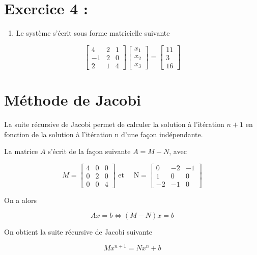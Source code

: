 \documentclass[10pt]{article}
\begin{document}
\section*{Exercice 4 :}
\begin{enumerate}
  \item Le système s'écrit sous forme matricielle suivante
\end{enumerate}

\[
\left[\begin{array}{ccc}
4 & 2 & 1 \\
-1 & 2 & 0 \\
2 & 1 & 4
\end{array}\right]\left[\begin{array}{l}
x_{1} \\
x_{2} \\
x_{3}
\end{array}\right]=\left[\begin{array}{c}
11 \\
3 \\
16
\end{array}\right]
\]

\section*{Méthode de Jacobi}
La suite récursive de Jacobi permet de calculer la solution à l'itération \(n+1\) en fonction de la solution à l'itération n d'une façon indépendante.

La matrice \(A\) s'écrit de la façon suivante \(A=M-N\), avec

\[
M=\left[\begin{array}{lll}
4 & 0 & 0 \\
0 & 2 & 0 \\
0 & 0 & 4
\end{array}\right] \text { et } \quad \mathrm{N}=\left[\begin{array}{ccc}
0 & -2 & -1 \\
1 & 0 & 0 \\
-2 & -1 & 0
\end{array}\right]
\]

On a alors

\[
A x=b \Leftrightarrow(M-N) x=b
\]

On obtient la suite récursive de Jacobi suivante

\[
M x^{n+1}=N x^{n}+b
\]
\end{document}
